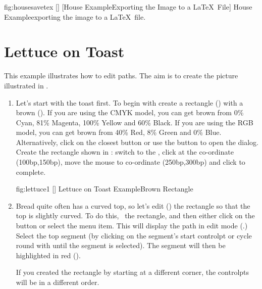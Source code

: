 \FloatFig
{fig:housesavetex}
[]
{}
[House Example\dash Exporting the Image to a \LaTeX\ File]
{House Example\dash exporting the image to a \LaTeX\ file.}

\section{Lettuce on Toast}\label{sec:toastexample}

This example illustrates how to edit paths. The aim is to create
the picture illustrated in .

\begin{enumerate}
\item Let's start with the toast first. To begin with create
a rectangle () with a brown
 (). If you are using
the CMYK model, you can get brown from 0\% Cyan, 81\% Magenta,
100\% Yellow and 60\% Black. If you are using the RGB model,
you can get brown from 40\% Red, 8\% Green and 0\% Blue.
Alternatively, click on the closest  button
or use the  button to open the
 dialog. Create the
rectangle shown in : switch to the
, \gls{click} at the co-ordinate 
(100\gls{bp},150\gls{bp}),
move the mouse to co-ordinate (250\gls{bp},300\gls{bp}) 
and \gls{click} to complete.

\FloatFig
{fig:lettuce1}
[]
{}
{Lettuce on Toast Example\dash Brown Rectangle}

\item Bread quite often has a curved top, so let's
edit () the rectangle
so that the top is slightly curved. To do this,
\select\ the rectangle, and
then either click on the  button or select the
 menu item. This will display
the \gls{path} in edit mode (.)
Select the top segment (by clicking on the segment's start
\gls{controlpt} or cycle round with  until
the segment is selected). The segment will then be highlighted in red
().

\begin{information}
If you created the rectangle by starting at a different corner, the
\glspl{controlpt} will be in a different order.
\end{information}


\end{enumerate}
